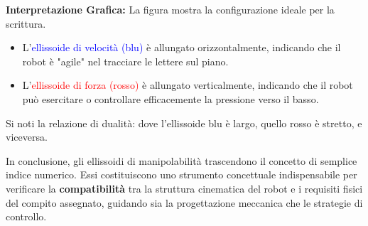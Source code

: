 \documentclass[11pt, a4paper]{report}
\begin{document}
\vspace{0.5cm}

\noindent
\begin{minipage}[c]{0.38\textwidth}
    \centering
\end{minipage}
\hfill
\begin{minipage}[c]{0.58\textwidth}
    \textbf{Interpretazione Grafica:}
    La figura mostra la configurazione ideale per la scrittura.
    \begin{itemize}
        \item L'\textcolor{blue}{ellissoide di velocità (blu)} è allungato orizzontalmente, indicando che il robot è "agile" nel tracciare le lettere sul piano.
        \item L'\textcolor{red}{ellissoide di forza (rosso)} è allungato verticalmente, indicando che il robot può esercitare o controllare efficacemente la pressione verso il basso.
    \end{itemize}
    Si noti la relazione di dualità: dove l'ellissoide blu è largo, quello rosso è stretto, e viceversa.
\end{minipage}

\vspace{0.5cm}

In conclusione, gli ellissoidi di manipolabilità trascendono il concetto di semplice indice numerico. Essi costituiscono uno strumento concettuale indispensabile per verificare la \textbf{compatibilità} tra la struttura cinematica del robot e i requisiti fisici del compito assegnato, guidando sia la progettazione meccanica che le strategie di controllo.
\end{document}
